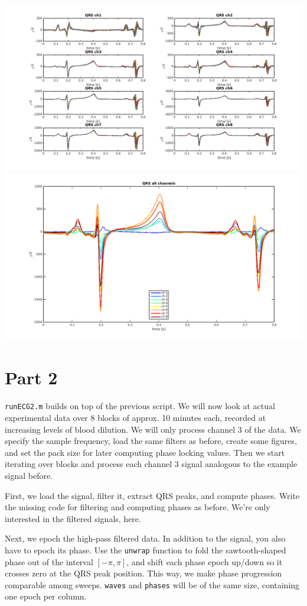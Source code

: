 \documentclass[10pt,a4paper,notitlepage]{report}
\begin{document}
\hspace{-1cm} \includegraphics[scale=0.25]{p2fig5.png}
\includegraphics[scale=0.25]{p2fig6.png}


\section*{Part 2}
\texttt{runECG2.m} builds on top of the previous script. We will now look at actual experimental data over 8 blocks of approx. 10 minutes each, recorded at increasing levels of blood dilution. We will only process channel 3 of the data. We specify the sample frequency, load the same filters as before, create some figures, and set the pack size for later computing phase locking values. Then we start iterating over blocks and process each channel 3 signal analogous to the example signal before.

First, we load the signal, filter it, extract QRS peaks, and compute phases. Write the missing code for filtering and computing phases as before. We're only interested in the filtered signals, here.

Next, we epoch the high-pass filtered data. In addition to the signal, you also have to epoch its phase. Use the \texttt{unwrap} function to fold the sawtooth-shaped phase out of the interval $[-\pi, \pi]$, and shift each phase epoch up/down so it crosses zero at the QRS peak position. This way, we make phase progression comparable among sweeps. \texttt{waves} and \texttt{phases} will be of the same size, containing one epoch per column.
\end{document}
